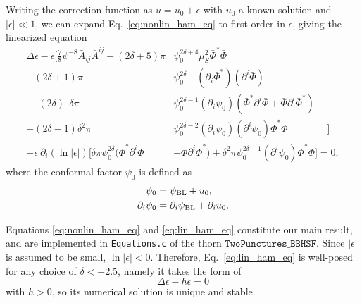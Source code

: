 Writing the correction function as $u = u_0 + \epsilon$ with $u_0$ a known solution
and $|\epsilon|\ll1$, 
we can expand Eq.~\eqref{eq:nonlin_ham_eq} to first order in $\epsilon$, giving
the linearized equation
\begin{align}
    \Delta\epsilon
    - \epsilon
    \Bigg[
        \frac{7}{8} \psi^{-8} \bar{A}_{ij} \bar{A}^{ij}
        - (2\delta + 5) \pi
        &\psi_0^{2\delta + 4}
        \mu_S^2 \bar{\Phi}^* \bar{\Phi}
        \nonumber
        \\
        - (2\delta + 1) \pi
        &\psi_0^{2\delta}\quad
        (\partial_i\bar{\Phi}^*)
        (\partial^i\bar{\Phi})
        \nonumber
        \\
        -\ \ (2\delta)\ \ \delta \pi
        &\psi_0^{2\delta-1} (\partial_i\psi_0)
        ( \bar{\Phi}^* \partial^i\bar{\Phi}
        + \bar{\Phi} \partial^i\bar{\Phi}^* )
        \nonumber
        \\
        - (2\delta-1) \delta^2 \pi
        &\psi_0^{2\delta-2}
        (\partial_i\psi_0) (\partial^i\psi_0)
        \bar{\Phi}^* \bar{\Phi}
    \quad\quad\quad\quad\Big]
    \nonumber
    \\
    +
    \epsilon\
    \partial_i(\ln|\epsilon|)
    \Big[
        \delta \pi \psi_0^{2\delta}
        ( \bar{\Phi}^* \partial^i\bar{\Phi}
        &+ \bar{\Phi} \partial^i\bar{\Phi}^* )
        +
        \delta^2 \pi \psi_0^{2\delta-1} (\partial^i\psi_0)
        \bar{\Phi}^* \bar{\Phi}
    \Big]= 0,
    \label{eq:lin_ham_eq}
\end{align}
where the conformal factor $\psi_0$ is defined as
\begin{align}
    \psi_0
    &= \psi_{\rm BL} + u_0,
    \\
    \partial_i \psi_0
    &= \partial_i \psi_{\rm BL}
    + \partial_i u_0.
\end{align}

Equations \eqref{eq:nonlin_ham_eq} and \eqref{eq:lin_ham_eq} constitute our main result,
and are implemented in \texttt{Equations.c} of the thorn $\texttt{TwoPunctures\_BBHSF}$.
Since $|\epsilon|$ is assumed to be small, $\ln|\epsilon| < 0$.
Therefore, Eq.~\eqref{eq:lin_ham_eq} is well-posed for any choice of $\delta < -2.5$,
namely it takes the form of 
\begin{equation}
    \Delta \epsilon - h \epsilon = 0
\end{equation}
with $h>0$,
so its numerical solution is unique and stable.

